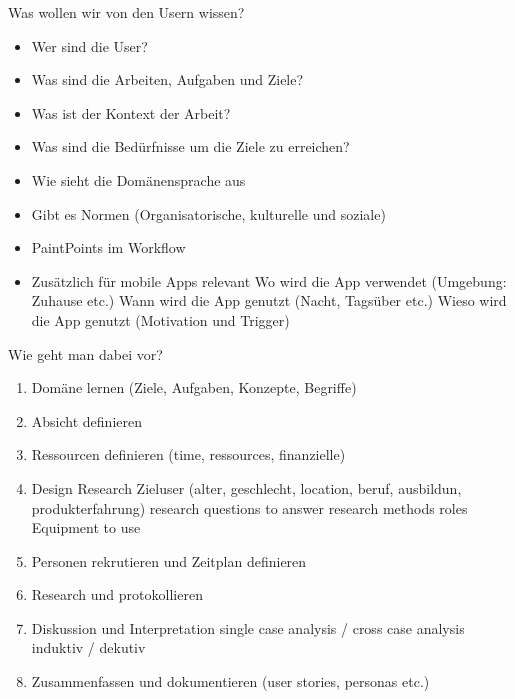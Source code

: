 \documentclass{report}
\theoremstyle{definition}
\theoremstyle{example}
\begin{document}
Was wollen wir von den Usern wissen?
\begin{itemize}
   \item Wer sind die User?
   \item Was sind die Arbeiten, Aufgaben und Ziele?
   \item Was ist der Kontext der Arbeit?
   \item Was sind die Bedürfnisse um die Ziele zu erreichen?
   \item Wie sieht die Domänensprache aus
   \item Gibt es Normen (Organisatorische, kulturelle und soziale)
   \item PaintPoints im Workflow
   \item Zusätzlich für mobile Apps relevant
   \subitem Wo wird die App verwendet (Umgebung: Zuhause etc.)
   \subitem Wann wird die App genutzt (Nacht, Tagsüber etc.)
   \subitem Wieso wird die App genutzt (Motivation und Trigger) 
\end{itemize}

Wie geht man dabei vor?
\begin{enumerate}
   \item Domäne lernen (Ziele, Aufgaben, Konzepte, Begriffe)
   \item Absicht definieren
   \item Ressourcen definieren (time, ressources, finanzielle)
   \item Design Research
   \subitem Zieluser (alter, geschlecht, location, beruf, ausbildun, produkterfahrung)
   \subitem research questions to answer
   \subitem research methods
   \subitem roles
   \subitem Equipment to use
   \item Personen rekrutieren und Zeitplan definieren
   \item Research und protokollieren
   \item Diskussion und Interpretation
   \subitem single case analysis / cross case analysis
   \subitem induktiv / dekutiv
   \item Zusammenfassen und dokumentieren (user stories, personas etc.) 
\end{enumerate}
\end{document}
